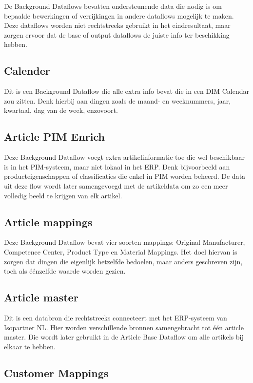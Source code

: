 De Background Dataflows bevatten ondersteunende data die nodig is om bepaalde bewerkingen of verrijkingen in andere dataflows mogelijk te maken. Deze dataflows worden niet rechtstreeks gebruikt in het eindresultaat, maar zorgen ervoor dat de base of output dataflows de juiste info ter beschikking hebben.

\subsection*{Calender}

Dit is een Background Dataflow die alle extra info bevat die in een DIM Calendar zou zitten. Denk hierbij aan dingen zoals de maand- en weeknummers, jaar, kwartaal, dag van de week, enzovoort.

\subsection*{Article PIM Enrich}

Deze Background Dataflow voegt extra artikelinformatie toe die wel beschikbaar is in het PIM-systeem, maar niet lokaal in het ERP. Denk bijvoorbeeld aan producteigenschappen of classificaties die enkel in PIM worden beheerd. De data uit deze flow wordt later samengevoegd met de artikeldata om zo een meer volledig beeld te krijgen van elk artikel.

\subsection*{Article mappings}

Deze Background Dataflow bevat vier soorten mappings: Original Manufacturer, Competence Center, Product Type en Material Mappings. Het doel hiervan is zorgen dat dingen die eigenlijk hetzelfde bedoelen, maar anders geschreven zijn, toch als éénzelfde waarde worden gezien.

\subsection*{Article master}

Dit is een databron die rechtstreeks connecteert met het ERP-systeem van Isopartner NL. Hier worden verschillende bronnen samengebracht tot één article master. Die wordt later gebruikt in de Article Base Dataflow om alle artikels bij elkaar te hebben.

\subsection*{Customer Mappings}

